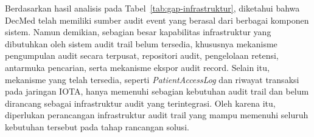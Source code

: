 Berdasarkan hasil analisis pada Tabel~\ref{tab:gap-infrastruktur}, diketahui bahwa DecMed telah memiliki sumber audit event yang berasal dari berbagai komponen sistem. Namun demikian, sebagian besar kapabilitas infrastruktur yang dibutuhkan oleh sistem audit trail belum tersedia, khususnya mekanisme pengumpulan audit secara terpusat, repositori audit, pengelolaan retensi, antarmuka pencarian, serta mekanisme ekspor audit record. Selain itu, mekanisme yang telah tersedia, seperti \textit{PatientAccessLog} dan riwayat transaksi pada jaringan IOTA, hanya memenuhi sebagian kebutuhan audit trail dan belum dirancang sebagai infrastruktur audit yang terintegrasi. Oleh karena itu, diperlukan perancangan infrastruktur audit trail yang mampu memenuhi seluruh kebutuhan tersebut pada tahap rancangan solusi.